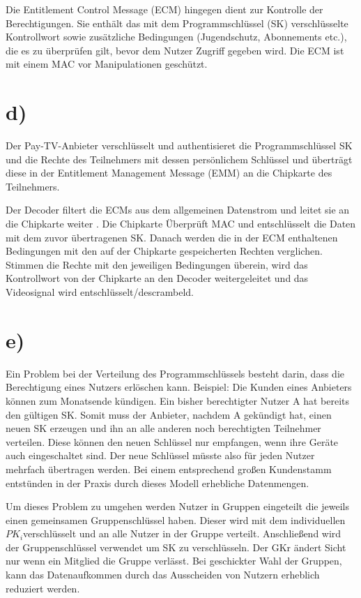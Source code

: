 \documentclass[12pt.twoside,a4paper,notitlepage,parskip]{scrartcl}
\begin{document}
Die Entitlement Control Message (ECM) hingegen dient zur Kontrolle der Berechtigungen. Sie enthält das mit dem Programmschlüssel (SK) verschlüsselte Kontrollwort sowie zusätzliche Bedingungen (Jugendschutz, Abonnements etc.), die es zu überprüfen gilt, bevor dem Nutzer Zugriff gegeben wird. Die ECM ist mit einem MAC vor Manipulationen geschützt. 

\section*{d)}
Der Pay-TV-Anbieter verschlüsselt und authentisieret die Programmschlüssel SK und die Rechte des Teilnehmers mit dessen persönlichem Schlüssel  und überträgt diese in der Entitlement Management Message (EMM) an die Chipkarte des Teilnehmers.

Der Decoder filtert die ECMs aus dem allgemeinen Datenstrom  und leitet sie an die Chipkarte weiter . Die Chipkarte Überprüft MAC  und entschlüsselt die Daten mit dem zuvor übertragenen SK. Danach werden die in der ECM enthaltenen Bedingungen mit den auf der Chipkarte gespeicherten Rechten verglichen. Stimmen  die Rechte mit den jeweiligen Bedingungen überein, wird das Kontrollwort von der Chipkarte an den Decoder weitergeleitet und das Videosignal wird entschlüsselt/descrambeld.

\section*{e)}
Ein Problem bei der Verteilung des Programmschlüssels besteht darin, dass die Berechtigung eines Nutzers erlöschen kann. Beispiel: Die Kunden eines Anbieters können zum Monatsende kündigen. Ein bisher berechtigter Nutzer A hat bereits den gültigen SK. Somit muss der Anbieter, nachdem A gekündigt hat, einen neuen SK erzeugen und ihn an alle anderen noch berechtigten Teilnehmer verteilen. Diese können den neuen Schlüssel nur empfangen, wenn ihre Geräte auch eingeschaltet sind. Der neue Schlüssel müsste also für jeden Nutzer mehrfach übertragen werden. Bei einem entsprechend großen Kundenstamm entstünden in der Praxis durch dieses Modell erhebliche Datenmengen. 

Um dieses Problem zu umgehen werden Nutzer in Gruppen eingeteilt die jeweils einen gemeinsamen Gruppenschlüssel haben. Dieser wird mit dem individuellen $PK_{i} $verschlüsselt und an alle Nutzer in der Gruppe verteilt. Anschließend wird der Gruppenschlüssel verwendet um SK zu verschlüsseln. Der GKr ändert Sicht nur wenn ein Mitglied die Gruppe verlässt. Bei geschickter Wahl der Gruppen, kann das Datenaufkommen durch das Ausscheiden von Nutzern erheblich reduziert werden.
\end{document}
